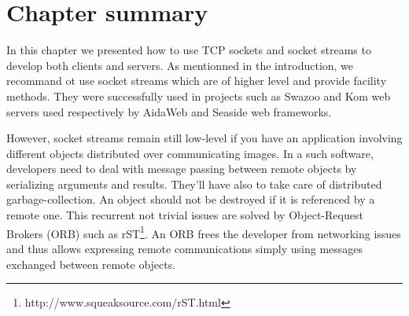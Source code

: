 \documentclass[a4paper,10pt,twoside]{book}
\begin{document}
%
%
%
%
%
%
%
%
%
%
%
%
%

\section{Chapter summary}
In this chapter we presented how to use TCP sockets and socket streams to develop both clients and servers.
As mentionned in the introduction, we recommand ot use socket streams which are of higher level and provide facility methods.
They were successfully used in projects such as Swazoo and Kom web servers used respectively by AidaWeb and Seaside web frameworks.

However, socket streams remain still low-level if you have an application involving different objects distributed over communicating images.
In a such software, developers need to deal with message passing between remote objects by serializing arguments and results.
They'll have also to take care of distributed garbage-collection.
An object should not be destroyed if it is referenced by a remote one.
This recurrent not trivial issues are solved by Object-Request Brokers (ORB) such as rST\footnote{http://www.squeaksource.com/rST.html}.
An ORB frees the developer from networking issues and thus allows expressing remote communications simply using messages exchanged between remote objects.



\ifx\wholebook\relax\else
\end{document}
